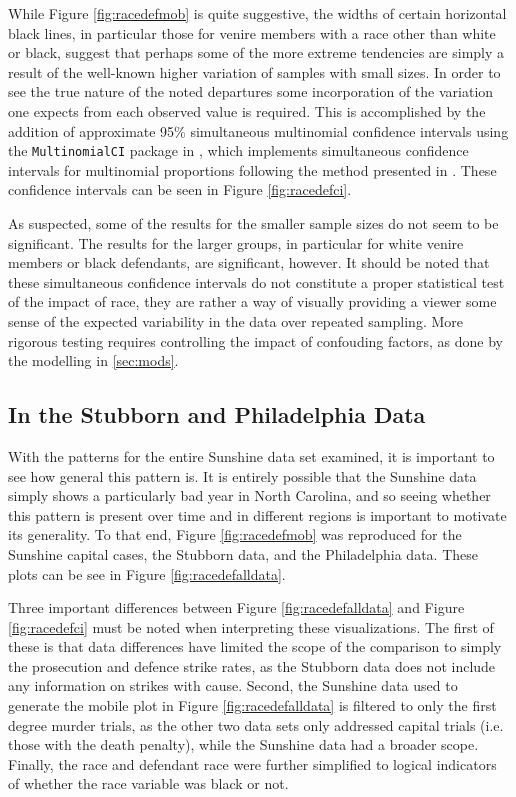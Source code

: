 While Figure \ref{fig:racedefmob} is quite suggestive, the widths of certain horizontal black lines, in particular those for
venire members with a race other than white or black, suggest that perhaps some of the more extreme tendencies are simply a result
of the well-known higher variation of samples with small sizes. In order to see the true nature of the noted departures some
incorporation of the variation one expects from each observed value is required. This is accomplished by the addition of
approximate 95\%  simultaneous multinomial confidence intervals using the \texttt{MultinomialCI} package in \Rp, which implements
simultaneous confidence intervals for multinomial proportions following the method presented in \cite{sison1995}. These confidence
intervals can be seen in Figure \ref{fig:racedefci}.

As suspected, some of the results for the smaller sample sizes do not seem to be significant. The results for the larger groups,
in particular for white venire members or black defendants, are significant, however. It should be noted that these simultaneous
confidence intervals do not constitute a proper statistical test of the impact of race, they are rather a way of visually
providing a viewer some sense of the expected variability in the data over repeated sampling. More rigorous testing requires
controlling the impact of confouding factors, as done by the modelling in \ref{sec:mods}.

\subsection{In the Stubborn and Philadelphia Data}

With the patterns for the entire Sunshine data set examined, it is important to see how general this pattern is. It is entirely
possible that the Sunshine data simply shows a particularly bad year in North Carolina, and so seeing whether this pattern is
present over time and in different regions is important to motivate its generality. To that end, Figure \ref{fig:racedefmob} was
reproduced for the Sunshine capital cases, the Stubborn data, and the Philadelphia data. These plots can be see in Figure 
\ref{fig:racedefalldata}.

Three important differences between Figure \ref{fig:racedefalldata} and  Figure \ref{fig:racedefci} must be noted when
interpreting these visualizations. The first of these is that data differences have limited the scope of the comparison to simply
the prosecution and defence strike rates, as the Stubborn data does not include any information on strikes with cause. Second, the
Sunshine data used to generate the mobile plot in Figure \ref{fig:racedefalldata} is filtered to only the first degree murder
trials, as the other two data sets only addressed capital trials (i.e. those with the death penalty), while the Sunshine data had
a broader scope. Finally, the race and defendant race were further simplified to logical indicators of whether the race variable
was black or not.

